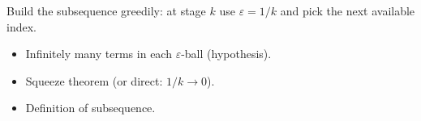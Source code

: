 \begin{remark*}
Build the subsequence greedily: at stage $k$ use $\varepsilon = 1/k$ and pick the next available index.
\end{remark*}

\begin{remark*}[Dependencies]
\begin{itemize}
  \item Infinitely many terms in each $\varepsilon$-ball (hypothesis).
  \item Squeeze theorem (or direct: $1/k \to 0$).
  \item Definition of subsequence.
\end{itemize}
\end{remark*}
